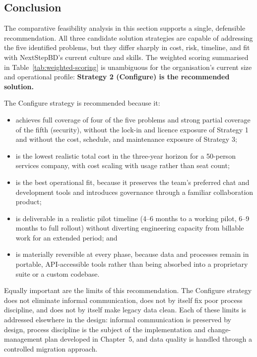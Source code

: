 \documentclass[12pt,a4paper]{report}
\begin{document}
\subsection{Conclusion}
\label{sec:analysis-conclusion}

The comparative feasibility analysis in this section supports a single, defensible
recommendation. All three candidate solution strategies are capable of addressing the five
identified problems, but they differ sharply in cost, risk, timeline, and fit with
NextStepBD's current culture and skills. The weighted scoring summarised in
Table~\ref{tab:weighted-scoring} is unambiguous for the organisation's current size and
operational profile: \textbf{Strategy 2 (Configure) is the recommended solution.}

The Configure strategy is recommended because it:

\begin{itemize}[leftmargin=1.6em]
    \item achieves full coverage of four of the five problems and strong partial coverage of
          the fifth (security), without the lock-in and licence exposure of Strategy 1 and
          without the cost, schedule, and maintenance exposure of Strategy 3;
    \item is the lowest realistic total cost in the three-year horizon for a 50-person
          services company, with cost scaling with usage rather than seat count;
    \item is the best operational fit, because it preserves the team's preferred chat and
          development tools and introduces governance through a familiar collaboration
          product;
    \item is deliverable in a realistic pilot timeline (4--6 months to a working pilot,
          6--9 months to full rollout) without diverting engineering capacity from billable
          work for an extended period; and
    \item is materially reversible at every phase, because data and processes remain in
          portable, API-accessible tools rather than being absorbed into a proprietary
          suite or a custom codebase.
\end{itemize}

Equally important are the limits of this recommendation. The Configure strategy does not
eliminate informal communication, does not by itself fix poor process discipline, and does
not by itself make legacy data clean. Each of these limits is addressed elsewhere in the
design: informal communication is preserved by design, process discipline is the subject of
the implementation and change-management plan developed in Chapter~5, and data quality is
handled through a controlled migration approach.
\end{document}
